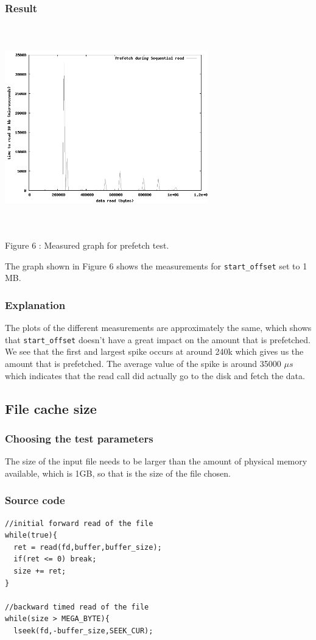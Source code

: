 \documentclass[twocolumn,11pt]{article}
\newcommand{\chumma}[1]{\subsubsection {#1}}
\newcommand{\mus}{$\mu s$}
\begin{document}
\begin{sloppypar}
\chumma{Result}

\includegraphics[width=250pt,height=250pt]{prefetch.png}
\begin{center}
Figure 6 : Measured graph for prefetch test.
\end{center}

The graph shown in Figure 6 shows the measurements for {\tt start\_offset}
set to 1 MB.

\chumma{Explanation}

 The plots of the different measurements are approximately
the same, which shows that {\tt start\_offset} doesn't have a great impact on
the amount that is prefetched. We see that the first and largest spike occurs
at around 240k which gives us the amount that is prefetched. The average value
of the spike is around 35000 \mus which indicates that the read call did actually
go to the disk and fetch the data.

\subsection{File cache size}

\chumma{Choosing the test parameters}

The size of the input file needs to be larger than the amount of physical memory
available, which is 1GB, so that is the size of the file chosen.

\chumma{Source code}
\begin{lstlisting}[frame=single]
//initial forward read of the file
while(true){
  ret = read(fd,buffer,buffer_size);
  if(ret <= 0) break;
  size += ret;
}

//backward timed read of the file
while(size > MEGA_BYTE){
  lseek(fd,-buffer_size,SEEK_CUR);
  

\end{lstlisting}
\end{sloppypar}
\end{document}
